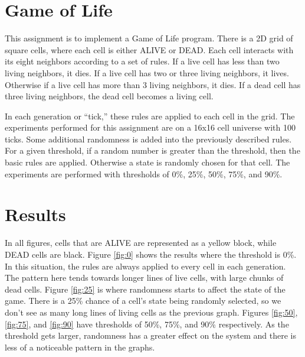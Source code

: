 \documentclass[11pt]{article}
\numberwithin{figure}{section}
\begin{document}

\maketitle

\section{Game of Life}
This assignment is to implement a Game of Life program.  There is a 2D grid of square cells, where each cell is either ALIVE or DEAD.  Each cell interacts with its eight neighbors according to a set of rules.  If a live cell has less than two living neighbors, it dies. If a live cell has two or three living neighbors, it lives.  Otherwise if a live cell has more than 3 living neighbors, it dies.  If a dead cell has three living neighbors, the dead cell becomes a living cell.  

In each generation or ``tick,'' these rules are applied to each cell in the grid.  The experiments performed for this assignment are on a 16x16 cell universe with 100 ticks.  Some additional randomness is added into the previously described rules.  For a given threshold, if a random number is greater than the threshold, then the basic rules are applied.  Otherwise a state is randomly chosen for that cell.  The experiments are performed with thresholds of 0\%, 25\%, 50\%, 75\%, and 90\%.  

\section{Results}
In all figures, cells that are ALIVE are represented as a yellow block, while DEAD cells are black.  Figure \ref{fig:0} shows the results where the threshold is 0\%.  In this situation, the rules are always applied to every cell in each generation.  The pattern here tends towards longer lines of live cells, with large chunks of dead cells.  Figure \ref{fig:25} is where randomness starts to affect the state of the game.  There is a 25\% chance of a cell's state being randomly selected, so we don't see as many long lines of living cells as the previous graph.  Figures \ref{fig:50}, \ref{fig:75}, and \ref{fig:90} have thresholds of 50\%, 75\%, and 90\% respectively.  As the threshold gets larger, randomness has a greater effect on the system and there is less of a noticeable pattern in the graphs.  
\end{document}
